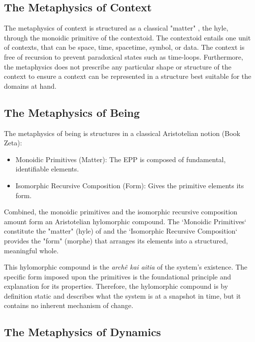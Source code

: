 \subsection{The Metaphysics of Context} 
\label{sec:metaphysics_context}

The metaphysics of context is structured as a classical "matter" , the hyle, through the
monoidic primitive of the contextoid. The contextoid entails one unit of contexts, that can be
space, time, spacetime, symbol, or data. The context is free of recursion to prevent paradoxical states such as time-loops. Furthermore, the metaphysics does not prescribe any particular shape or structure of the context to ensure a context can be represented in a structure best suitable for the domains at hand.


\subsection{The Metaphysics of Being} 
\label{sec:metaphysics_being}

The metaphysics of being is structures in a classical Aristotelian notion (Book Zeta\cite{furth1985metaphysics}): 

\begin{itemize}
	\item Monoidic Primitives (Matter): The EPP is composed of fundamental, identifiable elements.
	\item Isomorphic Recursive Composition (Form): Gives the primitive elements its form. 
\end{itemize}

Combined, the monoidic primitives and the isomorphic recursive composition amount form an Aristotelian hylomorphic compound. The `Monoidic Primitives` constitute the "matter" (hyle) of and the `Isomorphic Recursive Composition` provides the "form" (morphe) that arranges its elements into a structured, meaningful whole.

This hylomorphic compound is the  \textit{archê kai aitia} of the system's existence. The specific form imposed upon the primitives is the foundational principle and explanation for its properties. Therefore, the hylomorphic compound is by definition static and describes what the system is at a snapshot in time, but it contains no inherent mechanism of change. 

\newpage

\subsection{The Metaphysics of Dynamics} 
\label{sec:metaphysics_dynamics}

